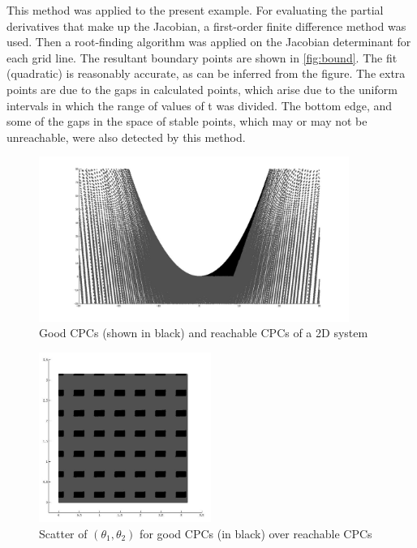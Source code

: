 This method was applied to the present example. For evaluating the partial 
derivatives that make up the Jacobian, a first-order finite difference 
method was used. Then a root-finding algorithm was applied on the Jacobian 
determinant for each grid line. The resultant boundary points are shown in 
\autoref{fig:bound}. The fit (quadratic) is reasonably accurate, as can be 
inferred from the figure. The extra points are due to the gaps in 
calculated points, which arise due to the uniform intervals in which 
the range of values of \gls{t} was divided. The bottom edge, and some 
of the gaps in the space of stable points, which may or may not be 
unreachable, were also detected by this method.
\begin{figure}
\centering
\includegraphics[width=0.9\textwidth]{s_in_uns.jpg}
\caption{Good CPCs (shown in black) and reachable CPCs of a 2D system}
\label{fig:s_vs_us}
\end{figure}
%
\begin{figure}
\centering
\includegraphics[width=0.5\textwidth]{theta_s_in_uns.jpg}
\caption{Scatter of $(\theta_1, \theta_2)$ for good CPCs (in black) over reachable CPCs}
\label{fig:theta}
\end{figure}
%
